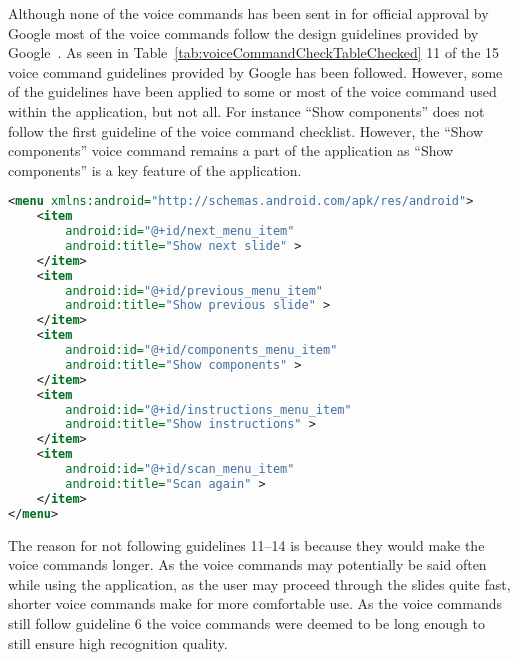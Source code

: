 Although none of the voice commands has been sent in for official approval by Google most of the voice commands follow the design guidelines provided by Google~\cite{glassVoiceChecklist}. As seen in Table~\ref{tab:voiceCommandCheckTableChecked} 11 of the 15 voice command guidelines provided by Google has been followed. However, some of the guidelines have been applied to some or most of the voice command used within the application, but not all. For instance ``Show components'' does not follow the first guideline of the voice command checklist. However, the ``Show components'' voice command remains a part of the application as ``Show components'' is a key feature of the application.

\newpage
\begin{lstlisting}[language=XML, caption={The voice command menu XML file}, label=voiceCommandXML]
<menu xmlns:android="http://schemas.android.com/apk/res/android">
	<item
		android:id="@+id/next_menu_item"
		android:title="Show next slide" >
	</item>
	<item
		android:id="@+id/previous_menu_item"
		android:title="Show previous slide" >
	</item>
	<item
		android:id="@+id/components_menu_item"
		android:title="Show components" >
	</item>
	<item
		android:id="@+id/instructions_menu_item"
		android:title="Show instructions" >
	</item>
	<item
		android:id="@+id/scan_menu_item"
		android:title="Scan again" >
	</item>
</menu>
\end{lstlisting}



The reason for not following guidelines 11--14 is because they would make the voice commands longer. As the voice commands may potentially be said often while using the application, as the user may proceed through the slides quite fast, shorter voice commands make for more comfortable use. As the voice commands still follow guideline 6 the voice commands were deemed to be long enough to still ensure high recognition quality.